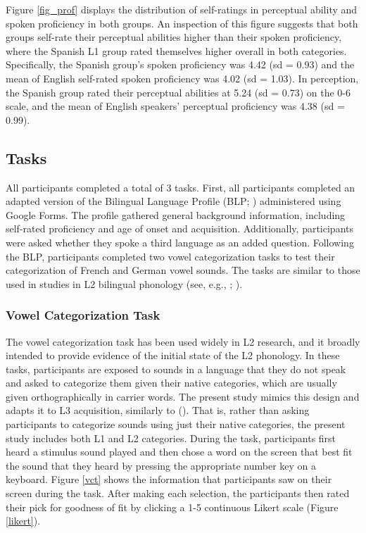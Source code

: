 \documentclass[preprints]{Definitions/mdpi}
\begin{document}
Figure \ref{fig_prof} displays the distribution of self-ratings in perceptual ability and spoken proficiency in both groups.
An inspection of this figure suggests that both groups self-rate their perceptual abilities higher than their spoken proficiency, where the Spanish L1 group rated themselves higher overall in both categories.
Specifically, the Spanish group's spoken proficiency was 4.42 (sd = 0.93) and the mean of English self-rated spoken proficiency
was 4.02 (sd = 1.03).
In perception, the Spanish group rated their perceptual abilities at 5.24 (sd = 0.73) on the 0-6 scale, and the mean of English speakers' perceptual proficiency
was 4.38 (sd = 0.99).

\hypertarget{tasks}{%
\subsection{Tasks}\label{tasks}}

All participants completed a total of 3 tasks.
First, all participants completed an adapted version of the Bilingual Language Profile (BLP; \citeauthor{birdsong_bilingual_2012} \citeyear{birdsong_bilingual_2012}) administered using Google Forms.
The profile gathered general background information, including self-rated proficiency and age of onset and acquisition.
Additionally, participants were asked whether they spoke a third language as an added question.
Following the BLP, participants completed two vowel categorization tasks to test their categorization of French and German vowel sounds.
The tasks are similar to those used in studies in L2 bilingual phonology (see, e.g., \citeauthor{bohn_nonnative_2007} \citeyear{bohn_nonnative_2007}; \citeauthor{van_leussen_learning_2015} \citeyear{van_leussen_learning_2015}).

\hypertarget{vowel-categorization-task}{%
\subsubsection{Vowel Categorization Task}\label{vowel-categorization-task}}

The vowel categorization task has been used widely in L2 research, and it broadly intended to provide evidence of the initial state of the L2 phonology.
In these tasks, participants are exposed to sounds in a language that they do not speak and asked to categorize them given their native categories, which are usually given orthographically in carrier words.
The present study mimics this design and adapts it to L3 acquisition, similarly to \citeauthor{wrembel_extending_2019} (\citeyear{wrembel_extending_2019}).
That is, rather than asking participants to categorize sounds using just their native categories, the present study includes both L1 and L2 categories.
During the task, participants first heard a stimulus sound played and then chose a word on the screen that best fit the sound that they heard by pressing the appropriate number key on a keyboard.
Figure \ref{vct} shows the information that participants saw on their screen during the task.
After making each selection, the participants then rated their pick for goodness of fit by clicking a 1-5 continuous Likert scale (Figure \ref{likert}).
\end{document}
